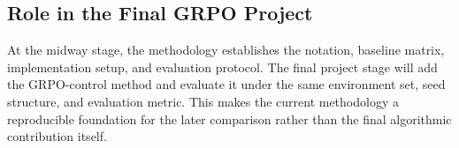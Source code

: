 \subsection{Role in the Final GRPO Project}
\label{sec:methodology-grpo-preparation}

At the midway stage, the methodology establishes the notation, baseline matrix, implementation setup, and evaluation protocol. The final project stage will add the GRPO-control method and evaluate it under the same environment set, seed structure, and evaluation metric. This makes the current methodology a reproducible foundation for the later comparison rather than the final algorithmic contribution itself.
